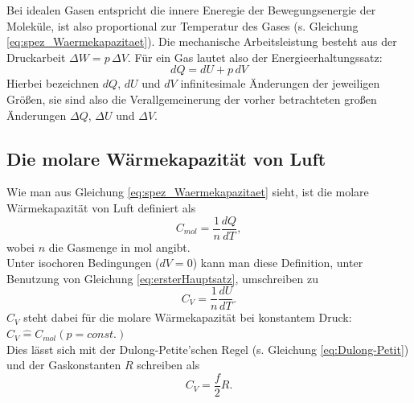 Bei idealen Gasen entspricht die innere Eneregie der Bewegungsenergie der Moleküle, ist also proportional zur Temperatur des Gases (s. Gleichung \ref{eq:spez_Waermekapazitaet}). Die mechanische Arbeitsleistung besteht aus der Druckarbeit $\Delta W = p\,\Delta V$. Für ein Gas lautet also der Energieerhaltungssatz:
\begin{equation} \label{eq:ersterHauptsatz}
	dQ = dU + p\,dV
\end{equation}
Hierbei bezeichnen $dQ$, $dU$ und $dV$ infinitesimale Änderungen der jeweiligen Größen, sie sind also die Verallgemeinerung der vorher betrachteten großen Änderungen $\Delta Q$, $\Delta U$ und $\Delta V$.

\subsection{Die molare Wärmekapazität von Luft}

Wie man aus Gleichung \ref{eq:spez_Waermekapazitaet} sieht, ist die molare Wärmekapazität von Luft definiert als
\begin{equation}
	C_{mol} = \frac{1}{n}\frac{dQ}{dT},
\end{equation}
wobei $n$ die Gasmenge in mol angibt.\\
Unter isochoren Bedingungen ($dV = 0$) kann man diese Definition, unter Benutzung von Gleichung \ref{eq:ersterHauptsatz}, umschreiben zu
\begin{equation}
	C_V = \frac{1}{n}\frac{dU}{dT}.
\end{equation}
$C_V$ steht dabei für die molare Wärmekapazität bei konstantem Druck: $C_V \hat{=} C_{mol}(p=const.)$\\
Dies lässt sich mit der Dulong-Petite'schen Regel (s. Gleichung \ref{eq:Dulong-Petit}) und der Gaskonstanten $R$ schreiben als
\begin{equation}
	C_V = \frac{f}{2}R.
\end{equation}

